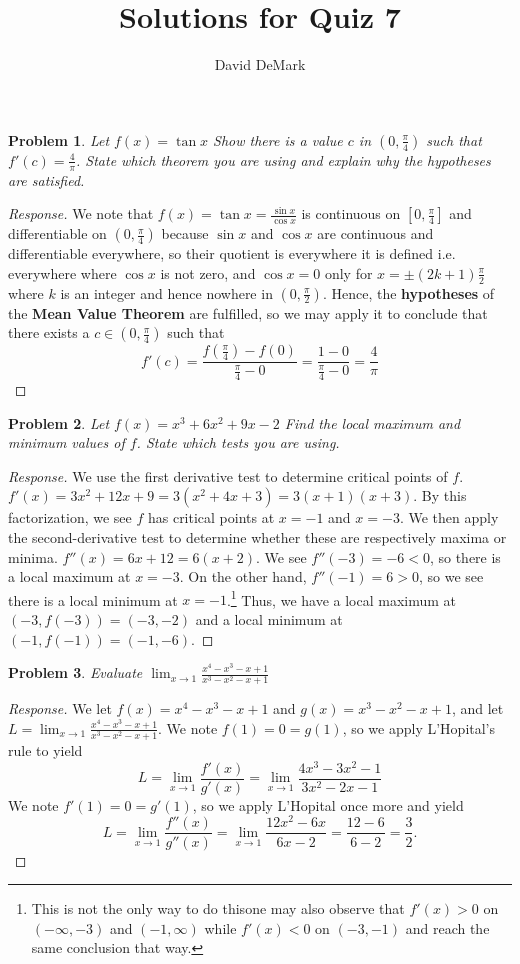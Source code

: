 \documentclass[english]{article}
\title{Solutions for Quiz 7}
\author{David DeMark}
\date{\due}
\newtheorem{problem}{Problem}
\theoremstyle{remark}
\theoremstyle{definition}
\begin{document}
	\maketitle

\begin{problem}
Let $f(x)=\tan x$	Show there is a value $c$ in $(0,\frac{\pi}{4})$ such that $f'(c)=\frac{4}{\pi}$. State which theorem you are using and explain why the hypotheses are satisfied.
\end{problem}
\begin{proof}[Response]
	We note that $f(x)=\tan x=\frac{\sin x}{\cos x}$ is continuous on $[0,\frac{\pi}{4}]$ and differentiable on $(0,\frac{\pi}{4})$ because $\sin x $ and $\cos x$ are continuous and differentiable everywhere, so their quotient is everywhere it is defined \textemdash i.e. everywhere where $\cos x$ is not zero, and $\cos x=0$ only for $x=\pm(2k+1)\frac{\pi}{2}$ where $k$ is an integer and hence nowhere in $(0,\frac{\pi}{2})$. Hence, the \textbf{hypotheses} of the \textbf{Mean Value Theorem} are fulfilled, so we may apply it to conclude that there exists a $c\in (0,\frac{\pi}{4})$ such that $$f'(c)=\frac{f(\frac{\pi}{4})-f(0)}{\frac{\pi}{4}-0}=\frac{1-0}{\frac{\pi}{4}-0} =\frac{4}{\pi}$$
	\end{proof}
\vspace{3em}
\begin{problem}
Let $f(x)=x^3+6x^2+9x-2$ Find the local maximum and minimum values of $f$. State which tests you are using.
\end{problem}
\begin{proof}[Response]
	We use the first derivative test to determine critical points of $f$. $f'(x)=3x^2+12x+9=3(x^2+4x+3)=3(x+1)(x+3)$. By this factorization, we see $f$ has critical points at $x=-1$ and $x=-3$. We then apply the second-derivative test to determine whether these are respectively maxima or minima. $f''(x)=6x+12=6(x+2)$. We see $f''(-3)=-6<0$, so there is a local maximum at $x=-3$. On the other hand, $f''(-1)=6>0$, so we see there is a local minimum at $x=-1$.\footnote{This is not the only way to do this\textemdash one may also observe that $f'(x)>0$ on $(-\infty,-3)$ and $(-1,\infty)$ while $f'(x)<0$ on $(-3,-1)$ and reach the same conclusion that way.} Thus, we have a local maximum at $(-3,f(-3))=(-3,-2)$ and a local minimum at $(-1,f(-1))=(-1,-6)$.
\end{proof}
\vspace{3em}
\begin{problem}
Evaluate $\displaystyle\lim_{x\to 1}\frac{x^4-x^3-x+1}{x^3-x^2-x+1}$
\end{problem}
\begin{proof}[Response]
	We let $f(x)=x^4-x^3-x+1$ and $g(x)=x^3-x^2-x+1$, and let $L=\displaystyle\lim_{x\to 1}\frac{x^4-x^3-x+1}{x^3-x^2-x+1}$.
 We note $f(1)=0=g(1)$, so we apply L'Hopital's rule to yield $$L=\lim_{x\to 1}\frac{f'(x)}{g'(x)}=\lim_{x\to 1}\frac{4x^3-3x^2-1}{3x^2-2x-1}$$
		We note $f'(1)=0=g'(1)$, so we apply L'Hopital once more and yield $$L=\lim_{x\to 1}\frac{f''(x)}{g''(x)}=\lim_{x\to 1}\frac{12x^2-6x}{6x-2}=\frac{12-6}{6-2}=\frac{3}{2}.$$
\end{proof}
\end{document}
